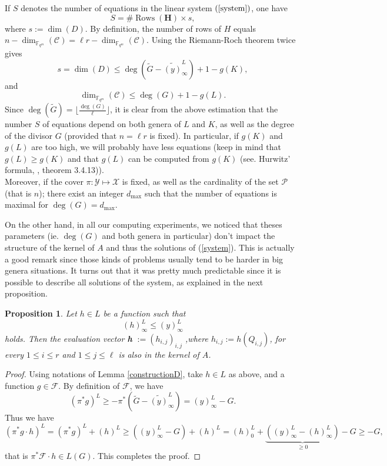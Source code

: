 \documentclass[10pt]{article}
\newtheorem{prop1}[thm]{Proposition}
\newcommand{\s}{\vspace{0.3cm}}
\newcommand{\cd}{\cdot}
\newcommand{\fqm}{\mathbb{F}_{q^m}}
\newcommand{\fq}{\mathbb{F}_q}
\newcommand{\X}{\mathcal{X}}
\newcommand{\Y}{\mathcal{Y}}
\newcommand{\PR}{\mathcal{P}}
\newcommand{\hugues}[1]{\textcolor{blue}{#1}}
\newcommand{\notehugues}[1]{\marginpar{\small\hugues{#1}}}
\begin{document}
\s 

If $S$ denotes the number of equations in the linear system $(\ref{system})$, one have 
\[S = \#\operatorname{Rows}(\mathbf{H}) \times s,\]
where $s := \dim( D)$. By definition, the number of rows of $H$ equals $n-\dim_{\fqm}(\mathcal{C})= \ell r - \dim_{\fqm}(\mathcal{C})$.
\notehugues{dimension sur $\fqm$ ou sur $\fq$~?}
Using the Riemann-Roch theorem  twice gives 
\[s = \dim ( D) \leq \deg\left( \tilde{G}-\widetilde{(y)}^L_{\infty}\right) +1 -  g(K) ,\]
and
\[\dim_{\fqm}(\mathcal{C}) \leq \deg(G)+1-g(L).\]
Since $\deg(\tilde{G}) = \lfloor \frac{\deg(G)}{\ell} \rfloor$, it is clear from the above estimation that the number $S$ of equations depend on both genera of $L$ and $K$, as well as the degree of the divisor $G$ (provided that $n=\ell r$ is fixed). In particular, if $g(K)$ and $g(L)$ are too high, we will probably have less equations (keep in mind that $g(L) \geq g(K)$ and that $g(L)$ can be computed from $g(K)$ (see. Hurwitz' formula, \cite{Sti}, theorem 3.4.13)). \\
Moreover, if the cover $\pi : \Y \longmapsto \X$ is fixed, as well as the cardinality of the set $\PR$ (that is $n$); there exist an integer $d_{\max}$ such that the number of equations is maximal for $\deg(G)=  d_{\max}$. 

\s

On the other hand, in all our computing experiments, we noticed that theses parameters (ie. $\deg(G)$ and both genera in particular) don't impact the structure of the kernel of $A$ and thus the solutions of (\ref{system}). This is actually a good remark\notehugues{que veux-tu dire~?} since those kinds of problems usually tend to be harder in big genera situations. It turns out that it was pretty much predictable since it is possible to describe all solutions of the system, as explained in the next proposition. 

\s

\begin{prop1} \label{othersolutions}
Let $h \in L$ be a function such that 
\[ (h)^L_{\infty} \leq (y)^L_{\infty}\]
holds. Then the evaluation vector \textbf{h} $ := (h_{i,j})_{i,j}$ ,where $h_{i,j} := h(Q_{i,j})$, for every $1 \leq i \leq r$ and $1 \leq j \leq \ell$ is also in the kernel of $A$.
\end{prop1}

\s

\begin{proof}
Using notations of Lemma \ref{constructionD}, take $h \in L$ as above, and a function $g \in \mathcal{F}$. By definition of $\mathcal{F}$, we have 
\[(\pi^*g)^L \geq -\pi^*\left(\tilde{G}-\widetilde{(y)}^L_{\infty}\right) = (y)^L_{\infty} - G.\]
Thus we have 
\[(\pi^*g \cd h)^L = (\pi^*g)^L  + (h)^L \geq  ((y)^L_{\infty} - G)+(h)^L = (h)^L_0 + \underbrace{((y)^L_{\infty}-(h)^L_{\infty})}_{\geq 0} - G \geq -G,\]
that is $\pi^*\mathcal{F}\cd h \in L(G)$. This completes the proof.

\end{proof}
\end{document}
